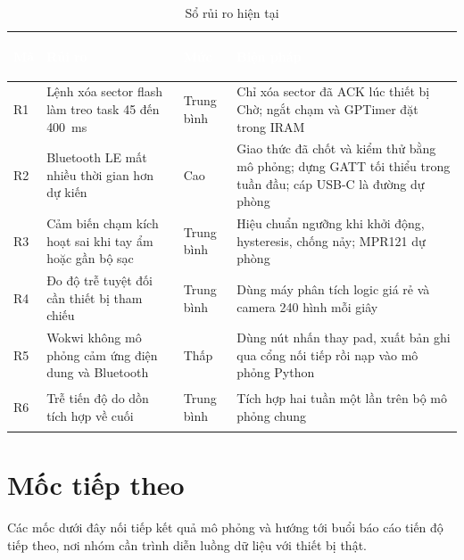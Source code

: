 \begin{table}[H]
    \centering
    \small
    \renewcommand{\arraystretch}{1.35}
    \caption{Sổ rủi ro hiện tại}
    \label{tab:risks}
    \begin{tabular}{>{\bfseries\raggedright\arraybackslash}m{0.8cm} >{\raggedright\arraybackslash}m{5.0cm} >{\centering\arraybackslash}m{1.2cm} >{\raggedright\arraybackslash}m{7.0cm}}
        \toprule
        \rowcolor{haitayblue}
        \textcolor{white}{Mã} & \textcolor{white}{Rủi ro} & \textcolor{white}{Mức} & \textcolor{white}{Biện pháp} \\
        \midrule
        \rowcolor{haitayblue!8}
        R1 & Lệnh xóa sector flash làm treo task 45 đến 400~ms & Trung bình & Chỉ xóa sector đã ACK lúc thiết bị Chờ; ngắt chạm và GPTimer đặt trong IRAM \\
        R2 & Bluetooth LE mất nhiều thời gian hơn dự kiến & Cao & Giao thức đã chốt và kiểm thử bằng mô phỏng; dựng GATT tối thiểu trong tuần đầu; cáp USB-C là đường dự phòng \\
        \rowcolor{haitayblue!8}
        R3 & Cảm biến chạm kích hoạt sai khi tay ẩm hoặc gần bộ sạc & Trung bình & Hiệu chuẩn ngưỡng khi khởi động, hysteresis, chống nảy; MPR121 dự phòng \\
        R4 & Đo độ trễ tuyệt đối cần thiết bị tham chiếu & Trung bình & Dùng máy phân tích logic giá rẻ và camera 240 hình mỗi giây \\
        \rowcolor{haitayblue!8}
        R5 & Wokwi không mô phỏng cảm ứng điện dung và Bluetooth & Thấp & Dùng nút nhấn thay pad, xuất bản ghi qua cổng nối tiếp rồi nạp vào mô phỏng Python \\
        R6 & Trễ tiến độ do dồn tích hợp về cuối & Trung bình & Tích hợp hai tuần một lần trên bộ mô phỏng chung \\
        \bottomrule
    \end{tabular}
\end{table}

\section{Mốc tiếp theo}
Các mốc dưới đây nối tiếp kết quả mô phỏng và hướng tới buổi báo cáo tiến độ tiếp theo, nơi nhóm cần trình diễn luồng dữ liệu với thiết bị thật.

